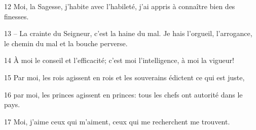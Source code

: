 
12 Moi, la Sagesse, j’habite avec l’habileté, j’ai appris à connaître bien des finesses.

13 – La crainte du Seigneur, c’est la haine du mal. Je hais l’orgueil, l’arrogance, le chemin du mal et la bouche perverse.

14 À moi le conseil et l’efficacité; c’est moi l’intelligence, à moi la vigueur!

15 Par moi, les rois agissent en rois et les souverains édictent ce qui est juste,

16 par moi, les princes agissent en princes: tous les chefs ont autorité dans le pays.

17 Moi, j’aime ceux qui m’aiment, ceux qui me recherchent me trouvent.